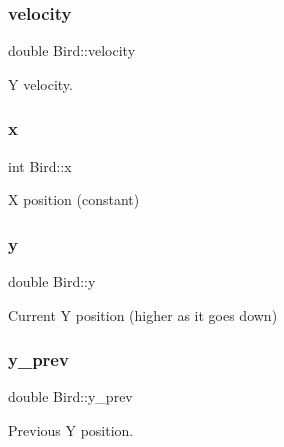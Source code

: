 \mbox{\label{group__flappy_gac9e51902eab494c5688633c5c56b5a1a}} 
\subsubsection{\texorpdfstring{velocity}{velocity}}
{\footnotesize\ttfamily double Bird\+::velocity}



Y velocity. 

\mbox{\label{group__flappy_gae4657ec5b3f2a736b7a17951590e5bea}} 
\subsubsection{\texorpdfstring{x}{x}}
{\footnotesize\ttfamily int Bird\+::x}



X position (constant) 

\mbox{\label{group__flappy_ga15a7c5b25ca78cfeb5602ccbcdc3c791}} 
\subsubsection{\texorpdfstring{y}{y}}
{\footnotesize\ttfamily double Bird\+::y}



Current Y position (higher as it goes down) 

\mbox{\label{group__flappy_gaf76198a3e19591093eac03361d16f009}} 
\subsubsection{\texorpdfstring{y\+\_\+prev}{y\_prev}}
{\footnotesize\ttfamily double Bird\+::y\+\_\+prev}



Previous Y position. 

